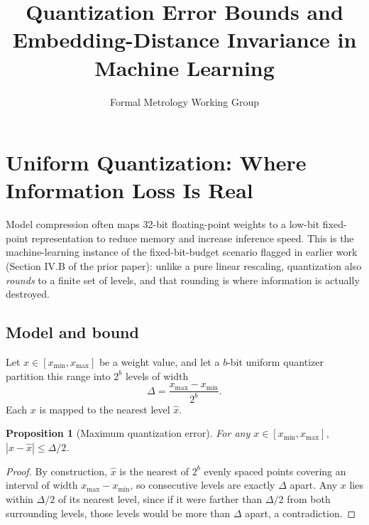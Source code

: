 \documentclass[10pt,journal,compsoc]{IEEEtran}
\newtheorem{proposition}{Proposition}
\begin{document}
\title{Quantization Error Bounds and Embedding-Distance Invariance in Machine Learning}
\author{Formal Metrology Working Group}


\maketitle

\section{Uniform Quantization: Where Information Loss Is Real}
Model compression often maps 32-bit floating-point weights to a low-bit fixed-point representation to reduce memory and increase inference speed. This is the machine-learning instance of the fixed-bit-budget scenario flagged in earlier work (Section IV.B of the prior paper): unlike a pure linear rescaling, quantization also \emph{rounds} to a finite set of levels, and that rounding is where information is actually destroyed.

\subsection{Model and bound}
Let $x \in [x_{\min}, x_{\max}]$ be a weight value, and let a $b$-bit uniform quantizer partition this range into $2^{b}$ levels of width
\begin{equation}
    \Delta = \frac{x_{\max}-x_{\min}}{2^{b}}.
\end{equation}
Each $x$ is mapped to the nearest level $\hat{x}$.

\begin{proposition}[Maximum quantization error]
For any $x\in[x_{\min},x_{\max}]$, $|x-\hat{x}| \le \Delta/2$.
\end{proposition}
\begin{proof}
By construction, $\hat{x}$ is the nearest of $2^{b}$ evenly spaced points covering an interval of width $x_{\max}-x_{\min}$, so consecutive levels are exactly $\Delta$ apart. Any $x$ lies within $\Delta/2$ of its nearest level, since if it were farther than $\Delta/2$ from both surrounding levels, those levels would be more than $\Delta$ apart, a contradiction.
\end{proof}
\end{document}
